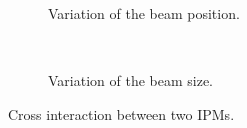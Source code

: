 \begin{figure}[!ht]
  \begin{subfigure}[t]{0.5\textwidth}
    
    \caption{Variation of the beam position.}
    \label{chap4:cross_position}
  \end{subfigure}
  ~
  \begin{subfigure}[t]{0.5\textwidth}
    
    \caption{Variation of the beam size.}
    \label{chap4:cross_size}
  \end{subfigure}
  \caption[Cross interaction between two IPMs.]{Cross interaction between two IPMs.}
  \label{chap4:cross}
\end{figure}
